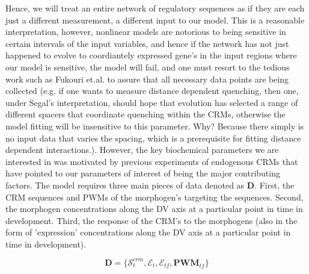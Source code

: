 Hence, we will treat an entire network of regulatory sequences as if they are each just a different measurement, a different input to our model.  This is a reasonable interpretation, however, nonlinear models are notorious to being sensitive in certain intervals of the input variables, and hence if the network has not just happened to evolve to coordiantely expressed gene's in the input regions where our model is sensitive, the model will fail, and one must resort to the tedious work such as Fukouri et.al.\cite{pmid20087339} to assure that all necessary data points are being collected (e.g. if one wants to measure distance dependent quenching, then one, under Segal's interpretation, should hope that evolution has selected a range of different spacers that coordinate quenching within the CRMs, otherwise the model fitting will be insensitive to this parameter.  Why?  Because there simply is no input data that varies the spacing, which is a prerequisite for fitting distance dependent interactions.).  However, the key biochemical parameters we are interested in was motivated by previous experiments of endogenous CRMs that have pointed to our parameters of interest of being the major contributing factors.  
%
The model requires three main pieces of data denoted as $ \mathbf{D}$.  First, the CRM sequences and PWMs of the morphogen's targeting the sequences. Second, the morphogen concentrations along the DV axis at a particular point in time in development.  Third, the response of the CRM's to the morphogens (also in the form of 'expression' concentrations along the DV axis at a particular point in time in development). 


  \begin{equation}\label{datasetf}
        \mathbf{D}=\{\mathcal{S}_t^{crm},\mathcal{E}_t,\mathcal{E}_{tf},\textbf{PWM}_{tf} \}
    \end{equation}

